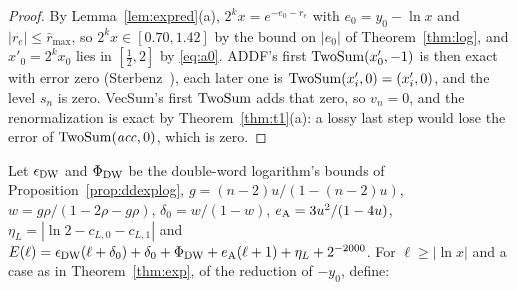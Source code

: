 \begin{proof}
By Lemma~\ref{lem:expred}(a), $2^kx = e^{-e_0 - r_e}$ with $e_0 = y_0 - \ln x$ and $|r_e| \le \bar r_{\max}$, so $2^kx \in
[0.70, 1.42]$ by the bound on $|e_0|$ of Theorem~\ref{thm:log}, and $x'_0 = 2^kx_0$ lies in $[\frac12, 2]$ by
\eqref{eq:a0}. ADDF's first $\mathrm{TwoSum}(x'_0, -1)$ is then exact with error zero (Sterbenz~\cite{Sterbenz74}), each later one is
$\mathrm{TwoSum}(x'_i, 0) = (x'_i, 0)$, and the level $s_n$ is zero. VecSum's first $\mathrm{TwoSum}$ adds that zero, so $v_n = 0$,
and the renormalization is exact by Theorem~\ref{thm:t1}(a): a lossy last step would lose the error of $\mathrm{TwoSum}(\mathit{acc},
0)$, which is zero.
\end{proof}

 Let $\epsilon_{\rm DW}$ and
$\Phi_{\rm DW}$ be the double-word logarithm's bounds of Proposition~\ref{prop:ddexplog}, $g = (n-2)u/(1 - (n-2)u)$, $w
= g\rho/(1 - 2\rho - g\rho)$, $\delta_0 = w/(1-w)$, $e_{\rm A} = 3u^2/(1 - 4u)$, $\eta_L = |\ln 2 - c_{L,0} -
c_{L,1}|$ and $E(\ell) = \epsilon_{\rm DW}(\ell + \delta_0) + \delta_0 + \Phi_{\rm DW} + e_{\rm A}(\ell + 1) +
\eta_L + 2^{-2000}$. For $\ell \ge |\ln x|$ and a case as in Theorem~\ref{thm:exp}, of the reduction of $-y_0$, define:
